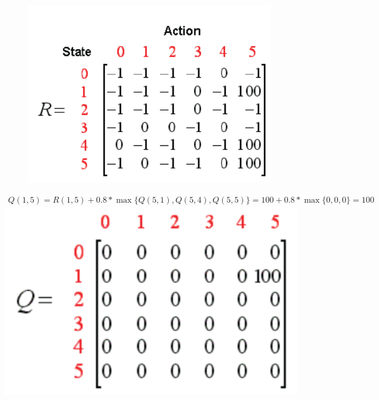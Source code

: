 \documentclass[11pt]{article}
\makeatletter
\def\maxwidth{\ifdim\Gin@nat@width>\linewidth\linewidth
    \else\Gin@nat@width\fi}
\let\Oldincludegraphics\includegraphics
\renewcommand{\includegraphics}[1]{\Oldincludegraphics[width=.8\maxwidth]{#1}}
\makeatother
\begin{document}
    \begin{figure}
\centering
\includegraphics{R.png}
\caption{}
\end{figure}

\(\begin{array}{l} Q\left( {1,5} \right) = R\left( {1,5} \right) + 0.8 * \max \{ Q(5,1),Q(5,4),Q(5,5)\} = 100 + 0.8*\max \{ 0,0,0\} = 100 \end{array}\)
\includegraphics{Q.png}
\end{document}
